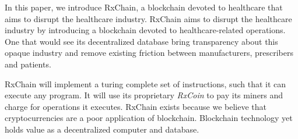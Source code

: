 In this paper, we introduce RxChain, a blockchain devoted to healthcare that aims to disrupt the healthcare industry.
RxChain aims to disrupt the healthcare industry by introducing a blockchain devoted to healthcare-related operations.
One that would see its decentralized database bring transparency about this opaque industry
and remove existing friction between manufacturers, prescribers and patients.

RxChain will implement a turing complete set of instructions, such that it can execute any program.
It will use its proprietary \emph{RxCoin} to pay its miners and charge for operations it executes.
RxChain exists because we believe that cryptocurrencies are a poor application of blockchain.
Blockchain technology yet holds value as a decentralized computer and database.





